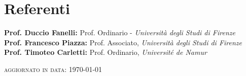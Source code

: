 \documentclass[11pt, a4paper]{moderncv}
\begin{document}
\section*{Referenti}

\textbf{Prof. Duccio Fanelli:} Prof. Ordinario - \textit{Università degli Studi di Firenze}\\[0.3em]
\textbf{Prof. Francesco Piazza:} Prof. Associato, \textit{Università degli Studi di Firenze}\\[0.3em]
\textbf{Prof. Timoteo Carletti:} Prof. Ordinario, \textit{Université de Namur}\\[0.3em]



\vfill

\begin{flushright}
\textsc{aggiornato in data:} \today
\end{flushright}
\end{document}
